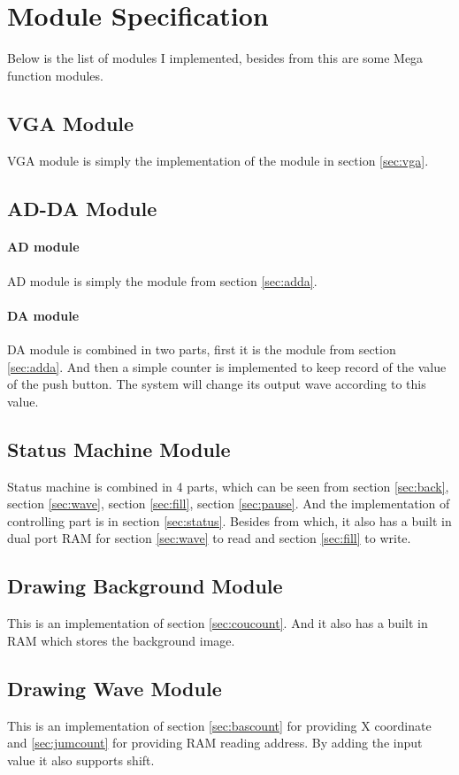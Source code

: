 \documentclass[11pt]{scrartcl}
\begin{document}
\section{Module Specification}

Below is the list of modules I implemented, besides from this are some Mega function modules.
\subsection{VGA Module}
VGA module is simply the implementation of the module in section \ref{sec:vga}.
\subsection{AD-DA Module}
\paragraph{AD module}
AD module is simply the module from section \ref{sec:adda}. 
\paragraph{DA module}

DA module is combined in two parts, first it is the module from section \ref{sec:adda}. And then a simple counter is implemented to keep record of the value of the push button. The system will change its output wave according to this value.

\subsection{Status Machine Module}
\label{sec:statusm}
Status machine is combined in 4 parts, which can be seen from section \ref{sec:back}, section \ref{sec:wave}, section \ref{sec:fill}, section \ref{sec:pause}. And the implementation of controlling part is in section \ref{sec:status}. Besides from which, it also has a built in dual port RAM for section \ref{sec:wave} to read and section \ref{sec:fill} to write.
\subsection{Drawing Background Module}
This is an implementation of section \ref{sec:coucount}. And it also has a built in RAM which stores the background image.
\label{sec:back}

\subsection{Drawing Wave Module}
This is an implementation of section \ref{sec:bascount} for providing X coordinate and \ref{sec:jumcount} for providing RAM reading address. By adding the input value it also supports shift.
\label{sec:wave}
\end{document}
